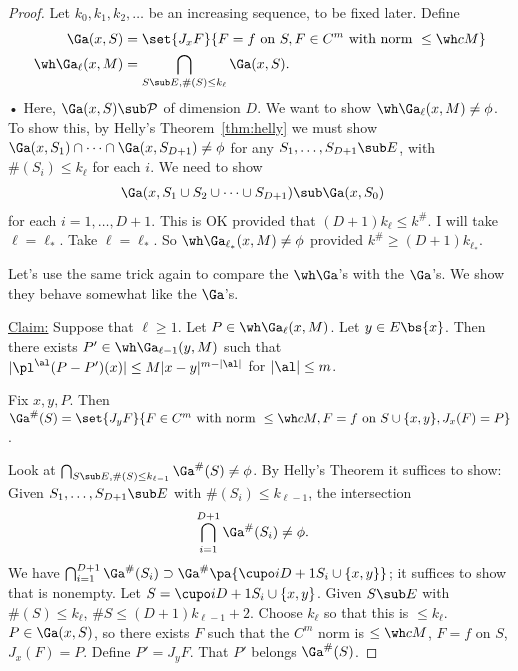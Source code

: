\begin{proof}
Let $k_0,k_1,k_2,\ldots$ be an increasing sequence, to be fixed later. Define
\begin{align}
\Ga(x,S) &= \set{J_xF}{F=f\text{ on }S, F\in C^m\text{ with norm }\le \wh cM}\\
\wh \Ga_\ell(x,M) &=
\bigcap_{S\sub E, \#(S)\le k_\ell} \Ga(x,S).
\end{align}•
Here, $\Ga(x,S)\sub \cal P$ of dimension $D$. We want to show $\wh \Ga_\ell(x,M)\ne \phi$. To show this, by Helly's Theorem~\ref{thm:helly} we must show $\Ga(x,S_1)\cap \cdots \cap \Ga(x,S_{D+1})\ne \phi$ for any $S_1,\ldots, S_{D+1}\sub E$, with $\#(S_i)\le k_\ell$ for each $i$. We need to show
\begin{align}
\Ga(x,S_1\cup S_2\cup \cdots \cup S_{D+1})
&\sub \Ga(x,S_0)
\end{align}
for each $i=1,\ldots, D+1$. This is OK provided that $(D+1)k_\ell\le k^\#$. I will take $\ell=\ell_*$. Take $\ell=\ell_*$. So $\wh \Ga_{\ell_*}(x,M)\ne \phi$ provided $k^\#\ge (D+1)k_{\ell_*}$. %

Let's use the same trick again to compare the $\wh \Ga$'s with the $\Ga$'s. We show they behave somewhat like the $\Ga$'s.

\ul{Claim:} Suppose that $\ell\ge 1$. Let $P\in \wh \Ga_\ell(x,M)$. Let $y\in E\bs \{x\}$. Then there exists $P'\in \wh \Ga_{\ell-1}(y,M)$ such that $|\pl^\al(P-P')(x)|\le M|x-y|^{m-|\al|}$ for $|\al|\le m$. 

Fix $x,y,P$. Then $\Ga^\#(S) = \set{J_yF}{F\in C^m \text{ with norm }\le \wh c M, F=f\text{ on }S\cup \{x,y\}, J_x(F)=P}$.

Look at $\bigcap_{S\sub E, \#(S)\le k_{\ell-1}}\Ga^\#(S)\ne \phi$. By Helly's Theorem it suffices to show: Given $S_1,\ldots, S_{D+1}\sub E$ with $\#(S_i)\le k_{\ell-1}$, the intersection
\begin{align}
\bigcap_{i=1}^{D+1}\Ga^\#(S_i) &\ne \phi.
\end{align}
We have $\bigcap_{i=1}^{D+1}\Ga^\#(S_i) \supset \Ga^\# \pa{\cupo i{D+1}S_i\cup \{x,y\}}$; it suffices to show that is nonempty. Let $S=\cupo i{D+1}S_i\cup \{x,y\}$.
Given $S\sub E$ with $\#(S)\le k_\ell$, 
$\#S \le (D+1)k_{\ell-1}+2$. Choose $k_\ell$ so that this is $\le k_\ell$.
$P\in \Ga(x,S)$, %
so there exists $F$ such that the $C^m$ norm is $\le \wh cM$, $F=f$ on $S$, $J_x(F)=P$. Define $P'=J_yF$.  That $P'$ belongs $\Ga^\#(S)$. 


\end{proof}
